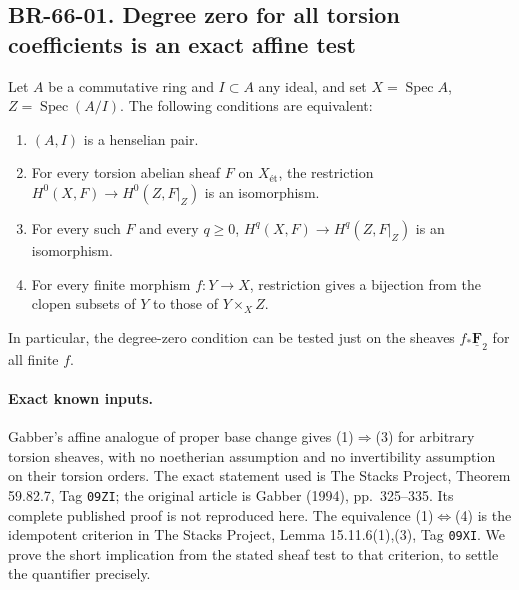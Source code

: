 \documentclass[11pt,a4paper]{article}
\theoremstyle{definition}\newtheorem{definition}[theorem]{Definition}
\theoremstyle{remark}\newtheorem{remark}[theorem]{Remark}
\begin{document}
\subsection{BR-66-01. Degree zero for all torsion coefficients is an exact affine test}
Let $A$ be a commutative ring and $I\subset A$ any ideal, and set
$X=\operatorname{Spec}A$, $Z=\operatorname{Spec}(A/I)$. The following
conditions are equivalent:
\begin{enumerate}
\item $(A,I)$ is a henselian pair.
\item For every torsion abelian sheaf $F$ on $X_{\text{ét}}$,
      the restriction $H^0(X,F)\to H^0(Z,F|_Z)$ is an isomorphism.
\item For every such $F$ and every $q\geq0$,
      $H^q(X,F)\to H^q(Z,F|_Z)$ is an isomorphism.
\item For every finite morphism $f:Y\to X$, restriction gives a
      bijection from the clopen subsets of $Y$ to those of
      $Y\times_X Z$.
\end{enumerate}
In particular, the degree-zero condition can be tested just on the
sheaves $f_*\underline{\mathbf F}_2$ for all finite $f$.

\paragraph{Exact known inputs.}
Gabber's affine analogue of proper base change gives (1)$\Rightarrow$(3)
for arbitrary torsion sheaves, with no noetherian assumption and no
invertibility assumption on their torsion orders. The exact statement
used is The Stacks Project, Theorem 59.82.7, Tag \nolinkurl{09ZI}; the
original article is Gabber (1994), pp.~325--335. Its complete published
proof is not reproduced here. The equivalence (1)$\Leftrightarrow$(4)
is the idempotent criterion in The Stacks Project, Lemma 15.11.6(1),(3),
Tag \nolinkurl{09XI}. We prove the short implication from the stated
sheaf test to that criterion, to settle the quantifier precisely.
\end{document}

